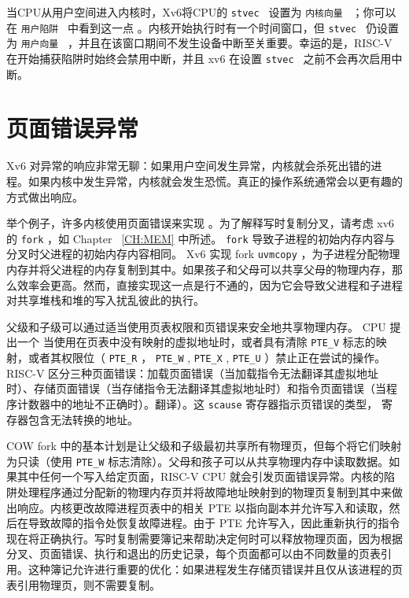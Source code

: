\documentclass[UTF8]{article}
\begin{document}
当CPU从用户空间进入内核时，Xv6将CPU的 {    \tt    stvec   } 设置为 {    \tt    内核向量   } ；你可以在  {    \tt    用户陷阱   }  中看到这一点
        。内核开始执行时有一个时间窗口，但  {    \tt    stvec   }  仍设置为  {    \tt    用户向量   }  ，并且在该窗口期间不发生设备中断至关重要。幸运的是，RISC-V 在开始捕获陷阱时始终会禁用中断，并且 xv6 在设置  {    \tt    stvec   }  之前不会再次启用中断。  

   \section{页面错误异常  }   
    \label{sec:pagefaults}     

Xv6 对异常的响应非常无聊：如果用户空间发生异常，内核就会杀死出错的进程。如果内核中发生异常，内核就会发生恐慌。真正的操作系统通常会以更有趣的方式做出响应。  

举个例子，许多内核使用页面错误来实现
        。为了解释写时复制分叉，请考虑 xv6 的    \lstinline{fork}    ，如 Chapter~    \ref{CH:MEM}    中所述。
    \lstinline{fork}    导致子进程的初始内存内容与分叉时父进程的初始内存内容相同。 Xv6 实现 fork
    \lstinline{uvmcopy}   
        ，为子进程分配物理内存并将父进程的内存复制到其中。如果孩子和父母可以共享父母的物理内存，那么效率会更高。然而，直接实现这一点是行不通的，因为它会导致父进程和子进程对共享堆栈和堆的写入扰乱彼此的执行。  

父级和子级可以通过适当使用页表权限和页错误来安全地共享物理内存。 CPU 提出一个
        当使用在页表中没有映射的虚拟地址时，或者具有清除    \lstinline{PTE_V}    标志的映射，或者其权限位（    \lstinline{PTE_R}    ，
    \lstinline{PTE_W}    ,
    \lstinline{PTE_X}    ,
    \lstinline{PTE_U}   ）禁止正在尝试的操作。 RISC-V 区分三种页面错误：加载页面错误（当加载指令无法翻译其虚拟地址时）、存储页面错误（当存储指令无法翻译其虚拟地址时）和指令页面错误（当程序计数器中的地址不正确时）。翻译）。这
    \lstinline{scause}    寄存器指示页错误的类型，       寄存器包含无法转换的地址。  

COW fork 中的基本计划是让父级和子级最初共享所有物理页，但每个将它们映射为只读（使用
    \lstinline{PTE_W}    标志清除）。父母和孩子可以从共享物理内存中读取数据。如果其中任何一个写入给定页面，RISC-V CPU 就会引发页面错误异常。内核的陷阱处理程序通过分配新的物理内存页并将故障地址映射到的物理页复制到其中来做出响应。内核更改故障进程页表中的相关 PTE 以指向副本并允许写入和读取，然后在导致故障的指令处恢复故障进程。由于 PTE 允许写入，因此重新执行的指令现在将正确执行。写时复制需要簿记来帮助决定何时可以释放物理页面，因为根据分叉、页面错误、执行和退出的历史记录，每个页面都可以由不同数量的页表引用。这种簿记允许进行重要的优化：如果进程发生存储页错误并且仅从该进程的页表引用物理页，则不需要复制。  
\end{document}
